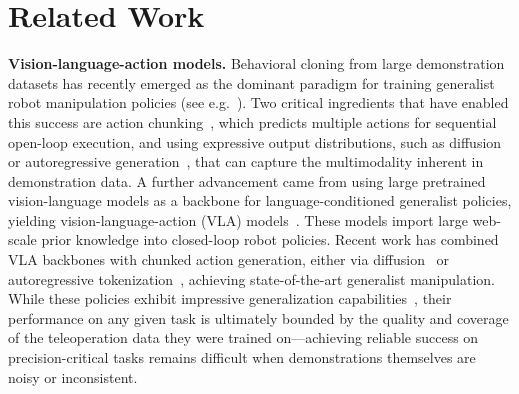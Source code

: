 \section{Related Work}
\label{sec:related}
\textbf{Vision-language-action models.}
Behavioral cloning from large demonstration datasets has recently emerged as the dominant paradigm for training generalist robot manipulation policies (see e.g.~\citep{rt22023arxiv,kim2024openvla,black2024pi_0,geminirobotics,wu2023unleashing,nvidia2025gr00tn1openfoundation}).
Two critical ingredients that have enabled this success are action chunking~\cite{zhao2023learningfinegrainedbimanualmanipulation}, which predicts multiple actions for sequential open-loop execution, and using expressive output distributions, such as diffusion~\cite{chi2023diffusion} or autoregressive generation~\cite{rt22023arxiv}, that can capture the multimodality inherent in demonstration data.
A further advancement came from using large pretrained vision-language models as a backbone for language-conditioned generalist policies, yielding vision-language-action (VLA) models~\cite{rt22023arxiv,kim2024openvla}.
These models import large web-scale prior knowledge into closed-loop robot policies.
Recent work has combined VLA backbones with chunked action generation, either via diffusion~\cite{black2024pi_0} or autoregressive tokenization~\cite{pertsch2025fast,minivla}, achieving state-of-the-art generalist manipulation.
While these policies exhibit impressive generalization capabilities~\cite{pi05,geminirobotics}, their performance on any given task is ultimately bounded by the quality and coverage of the teleoperation data they were trained on---achieving reliable success on precision-critical tasks remains difficult when demonstrations themselves are noisy or inconsistent.
 
